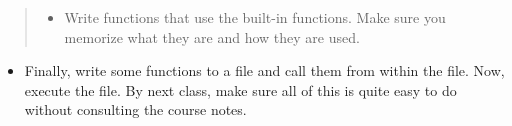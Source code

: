 \documentclass[letterpaper,10pt,english]{sphinxmanual}
\begin{document}
\begin{quote}
\begin{itemize}
\begin{sphinxVerbatim}[commandchars=\\\{\}]
 
      

 
     
      
\end{sphinxVerbatim}
\begin{itemize}
\item {} 
Write functions that use the built-in functions. Make sure you
memorize what they are and how they are used.

\end{itemize}

\end{itemize}
\end{quote}
\begin{itemize}
\item {} 
Finally, write some functions to a file and call them from within
the file. Now, execute the file. By next class, make sure all of this
is quite easy to do without consulting the course notes.

\end{itemize}
\end{document}
